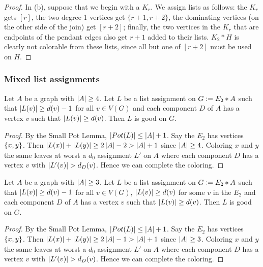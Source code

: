 \begin{proof}
In (b), suppose that we begin with a $K_r$.  We assign lists as follows: the
$K_r$ gets $[r]$, the two degree 1 vertices get $\{r+1,r+2\}$,
the dominating vertices (on the other side of the join) get $[r+2]$;
finally, the two vertices in the $K_r$ that are endpoints of the pendant edges
also get $r+1$ added to their lists.
$K_2*H$ is clearly not colorable from these lists, since all but one of $[r+2]$
must be used on $H$.
\end{proof}

\subsubsection{Mixed list assignments}
\begin{lem}\label{E2JoinWithSomeLow}\label{mixed}
Let $A$ be a graph with $\left|A\right| \geq 4$.  Let $L$ be a list assignment on $G \mathrel{\mathop:}= E_2 \mbox{\hspace{2 pt}$\ast$\hspace{2 pt}} A$ such that $\left|L(v)\right| \geq d(v) - 1$ for all $v \in V(G)$ and each component $D$ of $A$ has a vertex $v$ such that $\left|L(v)\right| \geq d(v)$.  Then $L$ is good on $G$.
\end{lem}
\begin{proof}
By the Small Pot Lemma, $\left|Pot(L)\right| \leq \left|A\right| + 1$.  Say the $E_2$ has vertices $\left\{ x, y \right\}$. Then $\left|L(x)\right| + \left|L(y)\right| \geq 2\left|A\right| - 2 > \left|A\right| + 1$ since $\left|A\right| \geq 4$.  Coloring $x$ and $y$ the same leaves at worst a $d_0$ assignment $L'$ on $A$ where each component $D$ has a vertex $v$ with $\left|L'(v)\right| > d_D(v)$.  Hence we can complete the coloring.
\end{proof}
\begin{lem}\label{E2JoinWithSomeLowOnBoth}\label{mixed3}
Let $A$ be a graph with $\left|A\right| \geq 3$.  Let $L$ be a list assignment on $G \mathrel{\mathop:}= E_2 \mbox{\hspace{2 pt}$\ast$\hspace{2 pt}} A$ such that $\left|L(v)\right| \geq d(v) - 1$ for all $v \in V(G)$, $\left|L(v)\right| \geq d(v)$ for some $v$ in the $E_2$ and each component $D$ of $A$ has a vertex $v$ such that $\left|L(v)\right| \geq d(v)$.  Then $L$ is good on $G$.
\end{lem}
\begin{proof}
By the Small Pot Lemma, $\left|Pot(L)\right| \leq \left|A\right| + 1$.  Say the $E_2$ has vertices $\left\{ x, y \right\}$. Then $\left|L(x)\right| + \left|L(y)\right| \geq 2\left|A\right| - 1 > \left|A\right| + 1$ since $\left|A\right| \geq 3$.  Coloring $x$ and $y$ the same leaves at worst a $d_0$ assignment $L'$ on $A$ where each component $D$ has a vertex $v$ with $\left|L'(v)\right| > d_D(v)$.  Hence we can complete the coloring.
\end{proof}

